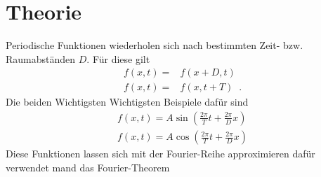 \section{Theorie}
\label{sec:Theorie}
Periodische Funktionen wiederholen sich nach bestimmten Zeit- bzw. Raumabständen $D$.
Für diese gilt
\begin{align}
  f(x,t)=&f(x+D,t)\\
  f(x,t)=&f(x,t+T)\;\;.
\end{align}
Die beiden Wichtigsten Wichtigsten Beispiele dafür sind
\begin{align}
f(x,t)=A\sin\left(\frac{2\pi}{T}t+\frac{2\pi}{D}x\right) \\
f(x,t)=A\cos\left(\frac{2\pi}{T}t+\frac{2\pi}{D}x\right)
\end{align}
Diese Funktionen lassen sich mit der Fourier-Reihe approximieren dafür verwendet
mand das Fourier-Theorem
